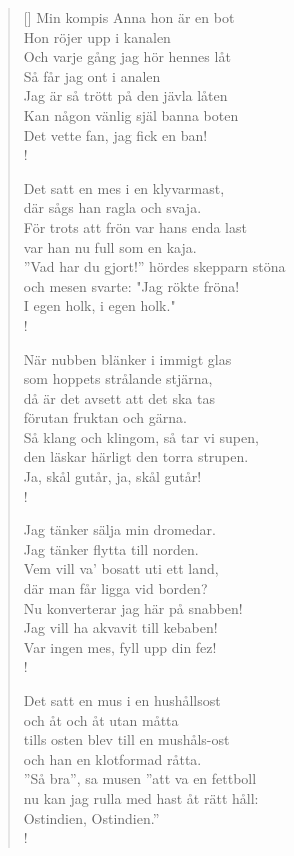 \documentclass[11pt, a4paper]{article} %
\begin{document}
\begin{verse}[\versewidth]
Min kompis Anna hon är en bot \\
Hon röjer upp i kanalen \\
Och varje gång jag hör hennes låt \\
Så får jag ont i analen \\
Jag är så trött på den jävla låten \\
Kan någon vänlig själ banna boten \\
Det vette fan, jag fick en ban! \\!

Det satt en mes i en klyvarmast, \\
där sågs han ragla och svaja. \\
För trots att frön var hans enda last \\
var han nu full som en kaja. \\
''Vad har du gjort!'' hördes skepparn stöna \\
och mesen svarte: "Jag rökte fröna! \\
I egen holk, i egen holk." \\!

När nubben blänker i immigt glas \\
som hoppets strålande stjärna, \\
då är det avsett att det ska tas \\
förutan fruktan och gärna. \\
Så klang och klingom, så tar vi supen, \\
den läskar härligt den torra strupen. \\
Ja, skål gutår, ja, skål gutår! \\!

Jag tänker sälja min dromedar. \\
Jag tänker flytta till norden. \\
Vem vill va’ bosatt uti ett land, \\
där man får ligga vid borden? \\
Nu konverterar jag här på snabben! \\
Jag vill ha akvavit till kebaben! \\
Var ingen mes, fyll upp din fez! \\!

Det satt en mus i en hushållsost \\
och åt och åt utan måtta \\
tills osten blev till en mushåls-ost \\
och han en klotformad råtta. \\
''Så bra'', sa musen ''att va en fettboll \\
nu kan jag rulla med hast åt rätt håll: \\
Ostindien, Ostindien.'' \\!


\end{verse}
\end{document}
